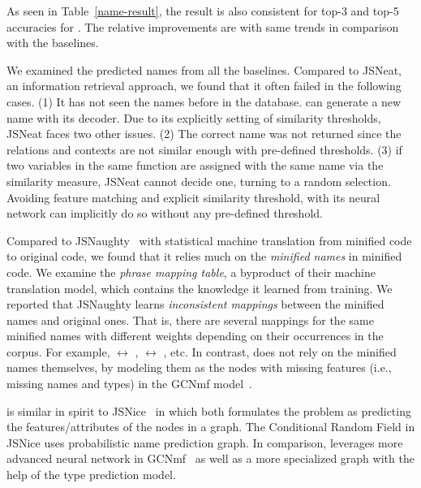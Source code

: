 As seen in Table~\ref{name-result}, the result is also consistent for
top-3 and top-5 accuracies for {\tool}. The relative improvements are
with same trends in comparison with the baselines.

We examined the predicted names from all the baselines. Compared to
JSNeat, an information retrieval approach, we found that it often
failed in the following cases. (1) It has not seen the names before in
the database. {\tool} can generate a new name with its decoder. Due to its
explicitly setting of similarity thresholds, JSNeat faces two other
issues. (2) The correct name was not returned since the relations
and contexts are not similar enough with pre-defined thresholds.  (3)
if two variables in the same function are assigned with the same name
via the similarity measure, JSNeat cannot decide one, turning to a
random selection. Avoiding feature matching and explicit similarity
threshold, {\tool} with its neural network can implicitly do so
without any pre-defined threshold.

Compared to JSNaughty~\cite{JSNaughty2017} with statistical machine
translation from minified code to original code, we found that it
relies much on the {\em minified names} in minified code. We examine
the {\em phrase mapping table}, a byproduct of their machine
translation model, which contains the knowledge it learned from
training. We reported that JSNaughty learns {\em inconsistent
  mappings} between the minified names and original ones. That is,
there are several mappings for the same minified names with different
weights depending on their occurrences in the corpus. For example,
 $\leftrightarrow$ ,  $\leftrightarrow$
, etc. In contrast, {\tool} does not rely on the minified
names themselves, by modeling them as the nodes with
missing features (i.e., missing names and types) in the GCNmf
model~\cite{GCNmf}.

{\tool} is similar in spirit to JSNice~\cite{JSNice2015} in which both
formulates the problem as predicting the features/attributes of the
nodes in a graph. The Conditional Random Field in JSNice uses
probabilistic name prediction graph. In comparison, {\tool} leverages
more advanced neural network in GCNmf~\cite{GCNmf} as well as a more
specialized graph with the help of the type prediction model.




